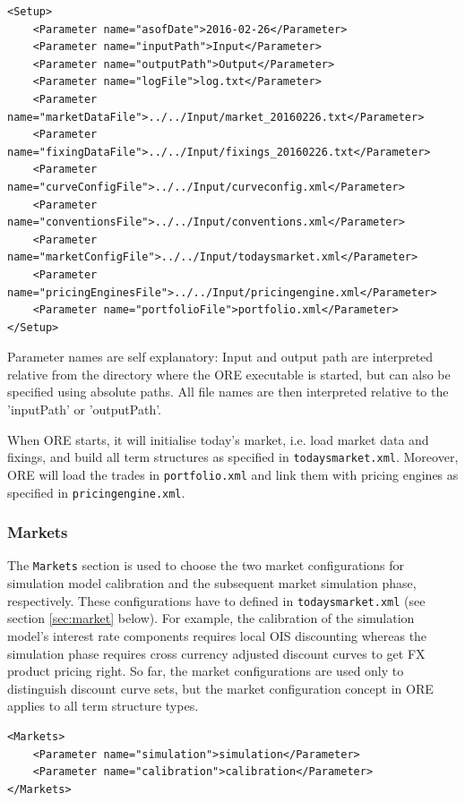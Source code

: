 \documentclass[12pt, a4paper]{article}
\begin{document}
\begin{lstlisting}[caption={ORE setup example},
 	label=lst:ore_setup]
<Setup>    
	<Parameter name="asofDate">2016-02-26</Parameter>
	<Parameter name="inputPath">Input</Parameter>
	<Parameter name="outputPath">Output</Parameter>
	<Parameter name="logFile">log.txt</Parameter>
	<Parameter name="marketDataFile">../../Input/market_20160226.txt</Parameter>
	<Parameter name="fixingDataFile">../../Input/fixings_20160226.txt</Parameter>
	<Parameter name="curveConfigFile">../../Input/curveconfig.xml</Parameter>
	<Parameter name="conventionsFile">../../Input/conventions.xml</Parameter>
	<Parameter name="marketConfigFile">../../Input/todaysmarket.xml</Parameter>
	<Parameter name="pricingEnginesFile">../../Input/pricingengine.xml</Parameter>
	<Parameter name="portfolioFile">portfolio.xml</Parameter>
</Setup>
\end{lstlisting}

Parameter names are self explanatory: Input and output path are interpreted relative from the directory where the ORE executable is started, but can also be specified using absolute paths. All file names are then interpreted relative to the 'inputPath' or 'outputPath'. 

When ORE starts, it will initialise today's market, i.e. load market data and fixings, and build all term structures as specified in {\tt todaysmarket.xml}. 
Moreover, ORE will load the trades in {\tt portfolio.xml} and link them with pricing engines as specified in {\tt pricingengine.xml}.    

\subsubsection*{Markets}

The {\tt Markets} section is used to choose the two market configurations for simulation model calibration and the subsequent market simulation phase, respectively. These configurations have to defined in {\tt todaysmarket.xml} (see section \ref{sec:market} below). For example, the calibration of the simulation model's interest rate components requires local OIS discounting whereas the simulation phase requires cross currency adjusted discount curves to get FX product pricing right. So far, the market configurations are used only to distinguish discount curve sets, but the market configuration concept in ORE applies to all term structure types.

\begin{lstlisting}[caption={ORE markets},
 	label=lst:ore_markets]
<Markets>
	<Parameter name="simulation">simulation</Parameter>
	<Parameter name="calibration">calibration</Parameter>
</Markets>
\end{lstlisting}
\end{document}
